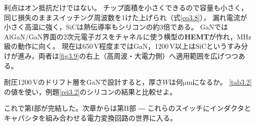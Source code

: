 利点はオン抵抗だけではない。
チップ面積を小さくできるので容量も小さく，同じ損失のままスイッチング周波数を1けた上げられ（式\ref{eq3.8}），
漏れ電流が小さく高温に強く，SiCは熱伝導率もシリコンの約3倍である。
GaNではAlGaN/GaN界面の2次元電子ガスをチャネルに使う横型の\textbf{HEMT}が作れ，MHz級の動作に向く。
現在は650\,V程度まではGaN，1200\,V以上はSiCというすみ分けが進み，両者は\ref{fig3.9}の右上（高周波・大電力側）へ適用範囲を広げつつある。

\begin{問}
\item 耐圧1200\,Vのドリフト層をGaNで設計すると，厚さ$W$は何$\mathrm{\mu m}$になるか。
\ref{tab3.2}の値を使い，例題\ref{rei3.2}のシリコンの結果と比較せよ。
\end{問}

これで第I部が完結した。次章からは第II部 ― これらのスイッチにインダクタとキャパシタを組み合わせる電力変換回路の世界に入る。

